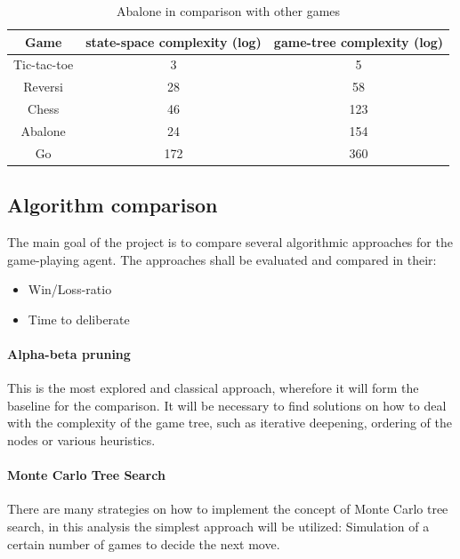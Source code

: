 \documentclass{llncs}
\begin{document}
\begin{table}
  \begin{center}
    \begin{tabular}{ | c | c | c | }
      \hline
      Game        & state-space complexity (log) & game-tree complexity (log) \\
      \hline
      Tic-tac-toe & 3                            & 5                          \\
      \hline
      Reversi     & 28                           & 58                         \\
      \hline
      Chess       & 46                           & 123                        \\
      \hline
      Abalone     & 24                           & 154                        \\
      \hline
      Go          & 172                          & 360                        \\
      \hline
    \end{tabular}
  \end{center}
  \caption{Abalone in comparison with other games \cite{chorus_implementing_2009}}
  \label{complexity_table}
\end{table}

\subsection{Algorithm comparison}
The main goal of the project is to compare several algorithmic approaches for the game-playing agent. The approaches shall be evaluated and compared in their:

\begin{itemize}
  \item Win/Loss-ratio
  \item Time to deliberate
\end{itemize}


\paragraph{Alpha-beta pruning}
This is the most explored and classical approach, wherefore it will form the baseline for the comparison. It will be necessary to find solutions on how to deal with the complexity of the game tree, such as iterative deepening, ordering of the nodes or various heuristics.

\paragraph{Monte Carlo Tree Search}
There are many strategies on how to implement the concept of Monte Carlo tree search, in this analysis the simplest approach will be utilized: Simulation of a certain number of games to decide the next move.
\end{document}
